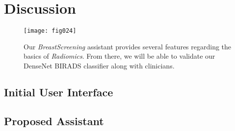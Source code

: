 \section{Discussion}
\label{sec:sec007}

\begin{figure}[t!]
\onecolumn
\centering
\texttt{[image: fig024]}
\caption{Our {\it BreastScreening} assistant provides several features regarding the basics of {\it Radiomics}. From there, we will be able to validate our DenseNet BIRADS classifier along with clinicians.}
\label{fig:fig024}
\twocolumn
\end{figure}

\subsection{Initial User Interface}
\label{sec:sec00701}

\subsection{Proposed Assistant}
\label{sec:sec00702}

\clearpage